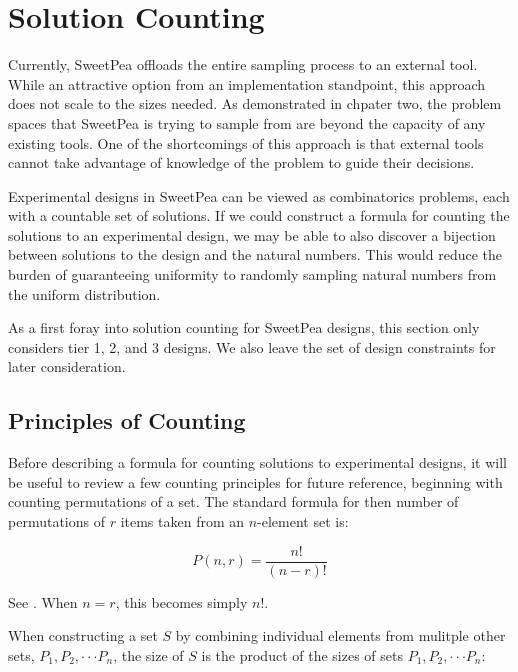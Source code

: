 
\chapter{Solution Counting}

Currently, SweetPea offloads the entire sampling process to an external tool. While an attractive option from an implementation standpoint, this approach does not scale to the sizes needed. As demonstrated in chpater two, the problem spaces that SweetPea is trying to sample from are beyond the capacity of any existing tools. One of the shortcomings of this approach is that external tools cannot take advantage of knowledge of the problem to guide their decisions.

Experimental designs in SweetPea can be viewed as combinatorics problems, each with a countable set of solutions. If we could construct a formula for counting the solutions to an experimental design, we may be able to also discover a bijection between solutions to the design and the natural numbers. This would reduce the burden of guaranteeing uniformity to randomly sampling natural numbers from the uniform distribution.

As a first foray into solution counting for SweetPea designs, this section only considers tier 1, 2, and 3 designs. We also leave the set of design constraints for later consideration.


\section{Principles of Counting}

Before describing a formula for counting solutions to experimental designs, it will be useful to review a few counting principles for future reference, beginning with counting permutations of a set. The standard formula for then number of permutations of $r$ items taken from an $n$-element set is:

\[
P(n,r) = \frac{n!}{(n-r)!}
\]

See \cite{brualdi_introductory_2010}. When $n =  r$, this becomes simply $n!$.



When constructing a set $S$ by combining individual elements from mulitple other sets, $P_1, P_2, \cdot\cdot\cdot P_n$, the size of $S$ is the product of the sizes of sets $P_1, P_2, \cdot\cdot\cdot P_n$:

